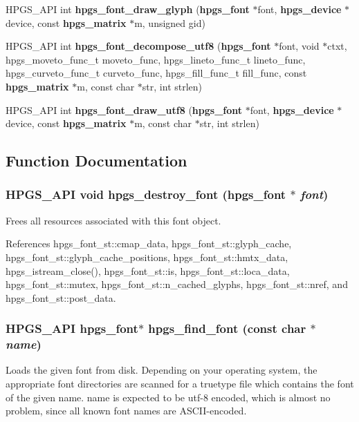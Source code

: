 \begin{DoxyCompactItemize}
\item 
HPGS\_\-API int {\bf hpgs\_\-font\_\-draw\_\-glyph} ({\bf hpgs\_\-font} $\ast$font, {\bf hpgs\_\-device} $\ast$device, const {\bf hpgs\_\-matrix} $\ast$m, unsigned gid)
\item 
HPGS\_\-API int {\bf hpgs\_\-font\_\-decompose\_\-utf8} ({\bf hpgs\_\-font} $\ast$font, void $\ast$ctxt, hpgs\_\-moveto\_\-func\_\-t moveto\_\-func, hpgs\_\-lineto\_\-func\_\-t lineto\_\-func, hpgs\_\-curveto\_\-func\_\-t curveto\_\-func, hpgs\_\-fill\_\-func\_\-t fill\_\-func, const {\bf hpgs\_\-matrix} $\ast$m, const char $\ast$str, int strlen)
\item 
HPGS\_\-API int {\bf hpgs\_\-font\_\-draw\_\-utf8} ({\bf hpgs\_\-font} $\ast$font, {\bf hpgs\_\-device} $\ast$device, const {\bf hpgs\_\-matrix} $\ast$m, const char $\ast$str, int strlen)
\end{DoxyCompactItemize}


\subsection{Function Documentation}
\subsubsection[{hpgs\_\-destroy\_\-font}]{\setlength{\rightskip}{0pt plus 5cm}HPGS\_\-API void hpgs\_\-destroy\_\-font ({\bf hpgs\_\-font} $\ast$ {\em font})}\label{group__font_ga76e917ef915da555fde6409eafb61fbd}
Frees all resources associated with this font object. 

References hpgs\_\-font\_\-st::cmap\_\-data, hpgs\_\-font\_\-st::glyph\_\-cache, hpgs\_\-font\_\-st::glyph\_\-cache\_\-positions, hpgs\_\-font\_\-st::hmtx\_\-data, hpgs\_\-istream\_\-close(), hpgs\_\-font\_\-st::is, hpgs\_\-font\_\-st::loca\_\-data, hpgs\_\-font\_\-st::mutex, hpgs\_\-font\_\-st::n\_\-cached\_\-glyphs, hpgs\_\-font\_\-st::nref, and hpgs\_\-font\_\-st::post\_\-data.

\subsubsection[{hpgs\_\-find\_\-font}]{\setlength{\rightskip}{0pt plus 5cm}HPGS\_\-API {\bf hpgs\_\-font}$\ast$ hpgs\_\-find\_\-font (const char $\ast$ {\em name})}\label{group__font_ga54168bad3f8e87d9d36865c6d5387b08}
Loads the given font from disk. Depending on your operating system, the appropriate font directories are scanned for a truetype file which contains the font of the given name. {\ttfamily name} is expected to be utf-\/8 encoded, which is almost no problem, since all known font names are ASCII-\/encoded. 

